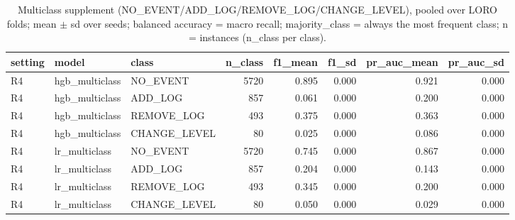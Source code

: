 \begin{table}[htbp]
\centering
\small
\caption{Multiclass supplement (NO\_EVENT/ADD\_LOG/REMOVE\_LOG/CHANGE\_LEVEL), pooled over LORO folds; mean $\pm$ sd over seeds; balanced accuracy = macro recall; majority\_class = always the most frequent class; n = instances (n\_class per class).}
\label{tab:multiclass_per_class}
\begin{tabular}{lllrrrrr}
\toprule
setting & model & class & n\_class & f1\_mean & f1\_sd & pr\_auc\_mean & pr\_auc\_sd \\
\midrule
R4 & hgb\_multiclass & NO\_EVENT & 5720 & 0.895 & 0.000 & 0.921 & 0.000 \\
R4 & hgb\_multiclass & ADD\_LOG & 857 & 0.061 & 0.000 & 0.200 & 0.000 \\
R4 & hgb\_multiclass & REMOVE\_LOG & 493 & 0.375 & 0.000 & 0.363 & 0.000 \\
R4 & hgb\_multiclass & CHANGE\_LEVEL & 80 & 0.025 & 0.000 & 0.086 & 0.000 \\
R4 & lr\_multiclass & NO\_EVENT & 5720 & 0.745 & 0.000 & 0.867 & 0.000 \\
R4 & lr\_multiclass & ADD\_LOG & 857 & 0.204 & 0.000 & 0.143 & 0.000 \\
R4 & lr\_multiclass & REMOVE\_LOG & 493 & 0.345 & 0.000 & 0.200 & 0.000 \\
R4 & lr\_multiclass & CHANGE\_LEVEL & 80 & 0.050 & 0.000 & 0.029 & 0.000 \\
\bottomrule
\end{tabular}
\end{table}
